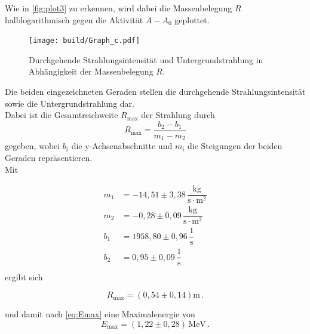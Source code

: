 Wie in \autoref{fig:plot3} zu erkennen, wird dabei die Massenbelegung $R$ halblogarithmisch gegen die Aktivität $A - A_0$ geplottet.
\begin{figure}[H]
    \centering
    \texttt{[image: build/Graph\_c.pdf]}
    \caption{Durchgehende Strahlungsintensität und Untergrundstrahlung in Abhängigkeit der Massenbelegung $R$.}
    \label{fig:plot3}
\end{figure}
Die beiden eingezeichneten Geraden stellen die durchgehende Strahlungsintensität sowie die Untergrundstrahlung dar. \\
Dabei ist die Gesamtreichweite $R_\text{max}$ der Strahlung durch
\begin{equation*}
    R_\text{max} = \frac{b_2 - b_1}{m_1 - m_2}
\end{equation*}
gegeben, wobei $b_i$ die y-Achsenabschnitte und $m_i$ die Steigungen der beiden Geraden repräsentieren. \\

Mit

\begin{align*}
    m_1 &= -14,51  \pm 3,38\,  \dfrac{\unit{\kilo\gram}}{\unit{\second \cdot \meter^2}}\\
    m_2 &= -0,28   \pm 0,09\,  \dfrac{\unit{\kilo\gram}}{\unit{\second \cdot \meter^2}}  \\
    b_1 &= 1958,80 \pm 0,96\,  \dfrac{1}{\unit{\second}}                         \\
    b_2 &= 0,95    \pm 0,09\,  \dfrac{1}{\unit{\second}}                          \\
\end{align*} ergibt sich

\begin{equation*}
    R_\text{max} = \left( 0,54 \pm 0,14 \right)  \unit{\meter} \,.
\end{equation*}

und damit nach \eqref{eq:Emax} eine Maximalenergie von
\begin{equation*}
    E_\text{max} = \left(1,22 \pm 0,28 \right) \, \unit{\mega\eV} \,.
\end{equation*}


